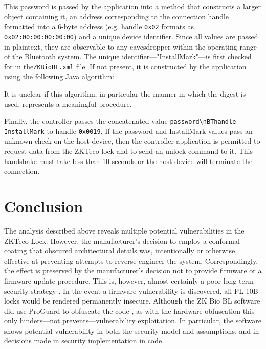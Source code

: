 \documentclass[conference]{IEEEtran}
\begin{document}
\bigskip

This password is passed by the application into a method that constructs a larger object containing it, an address corresponding to the connection handle formatted into a 6-byte address (e.g. handle \verb|0x02| formats as \verb|0x02:00:00:00:00:00|) and a unique device identifier.  Since all values are passed in plaintext, they are observable to any eavesdropper within the operating range of the Bluetooth system.  The unique identifier---"InstallMark"---is first checked for in the\verb|ZKBioBL.xml| file.  If not present, it is constructed by the application using the following Java algorithm:



It is unclear if this algorithm, in particular the manner in which the digest is used, represents a meaningful procedure.

\bigskip

Finally, the controller passes the concatenated value \verb|password\nBThandle-InstallMark| to handle \verb|0x0019|.  If the password and InstallMark values pass an unknown check on the host device, then the controller application is permitted to request data from the ZKTeco lock and to send an unlock command to it.  This handshake must take less than 10 seconds or the host device will terminate the connection.

\section{Conclusion}

The analysis described above reveals multiple potential vulnerabilities in the ZKTeco Lock. However, the manufacturer's decision to employ a conformal coating that obscured architectural details was, intentionally or otherwise, effective at preventing attempts to reverse engineer the system.  Correspondingly, the effect is preserved by the manufacturer's decision not to provide firmware or a firmware update procedure.  This is, however, almost certainly a poor long-term security strategy \cite{Rescorla2003}.  In the event a firmware vulnerability is discovered, all PL-10B locks would be rendered permanently insecure.  Although the ZK Bio BL software did use ProGuard to obfuscate the code \cite{AndroidDevelopers}, as with the hardware obfuscation this only hinders---not prevents---vulnerability exploitation.  In particular, the software shows potential vulnerability in both the security model and assumptions, and in decisions made in security implementation in code.
\end{document}
